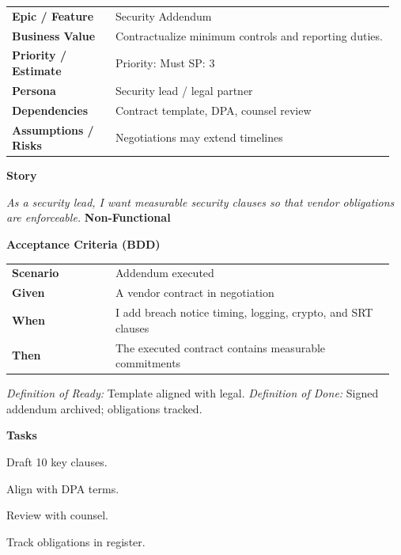 \documentclass[11pt,letterpaper]{article}
\makeatletter
\newenvironment{kvtable}{%
  \begin{tabular}{@{}>{\bfseries\arraybackslash}p{0.26\linewidth} p{0.70\linewidth}@{}}
}{\end{tabular}}
\newenvironment{bdd}{%
  \begin{tabular}{@{}>{\bfseries\arraybackslash}p{0.26\linewidth} p{0.70\linewidth}@{}}
}{\end{tabular}}
\newcommand{\DoRDoD}[2]{%
  \vspace{0.35em}
  {\footnotesize\color{Muted}%
    \textit{Definition of Ready:} #1 \; \textbullet\;
    \textit{Definition of Done:} #2%
  }%
}
\newenvironment{storycard}[2]{%
  \begin{tcolorbox}[cloudcard, title={#1 --- #2}]%
}{\end{tcolorbox}}
\newcommand{\sectionlabel}[1]{\vspace{0.35em}\textbf{#1}\par}
\makeatother
\begin{document}
\begin{storycard}{CCS-19}{Ch. 19 — Negotiating Security Requirements}
\begin{kvtable}
Epic / Feature & Security Addendum\\
Business Value & Contractualize minimum controls and reporting duties.\\
Priority / Estimate & Priority: Must \quad SP: 3\\
Persona & Security lead / legal partner\\
Dependencies & Contract template, DPA, counsel review\\
Assumptions / Risks & Negotiations may extend timelines\\
\end{kvtable}
\sectionlabel{Story}
\textit{As a security lead, I want measurable security clauses so that vendor obligations are enforceable.}
\sectionlabel{Non-Functional}\;
\sectionlabel{Acceptance Criteria (BDD)}
\begin{bdd}
Scenario & Addendum executed\\
Given & A vendor contract in negotiation\\
When & I add breach notice timing, logging, crypto, and SRT clauses\\
Then & The executed contract contains measurable commitments\\
\end{bdd}
\DoRDoD{Template aligned with legal.}{Signed addendum archived; obligations tracked.}
\sectionlabel{Tasks}
\begin{checklist}
\item Draft 10 key clauses.
\item Align with DPA terms.
\item Review with counsel.
\item Track obligations in register.
\end{checklist}
\end{storycard}
\end{document}
